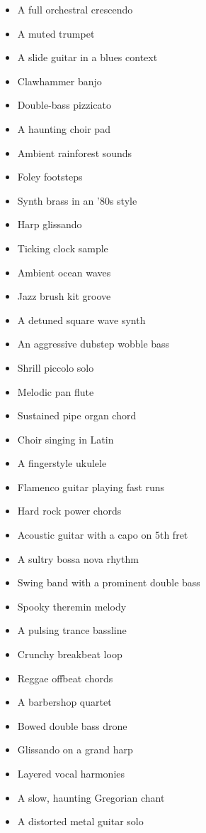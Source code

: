 \documentclass[
  a4paper,  %
  twoside,  %
  bibliography=totoc,
  headsepline,
  cleardoublepage=empty,
  parskip=half,
  draft=false
]{scrbook}
\begin{document}
\begin{multicols}{4}
\begin{itemize}
    \item A full orchestral crescendo
    \item A muted trumpet
    \item A slide guitar in a blues context
    \item Clawhammer banjo
    \item Double-bass pizzicato
    \item A haunting choir pad
    \item Ambient rainforest sounds
    \item Foley footsteps
    \item Synth brass in an '80s style
    \item Harp glissando
    \item Ticking clock sample
    \item Ambient ocean waves
    \item Jazz brush kit groove
    \item A detuned square wave synth
    \item An aggressive dubstep wobble bass
    \item Shrill piccolo solo
    \item Melodic pan flute
    \item Sustained pipe organ chord
    \item Choir singing in Latin
    \item A fingerstyle ukulele
    \item Flamenco guitar playing fast runs
    \item Hard rock power chords
    \item Acoustic guitar with a capo on 5th fret
    \item A sultry bossa nova rhythm
    \item Swing band with a prominent double bass
    \item Spooky theremin melody
    \item A pulsing trance bassline
    \item Crunchy breakbeat loop
    \item Reggae offbeat chords
    \item A barbershop quartet
    \item Bowed double bass drone
    \item Glissando on a grand harp
    \item Layered vocal harmonies
    \item A slow, haunting Gregorian chant
    \item A distorted metal guitar solo

\end{itemize}
\end{multicols}
\end{document}

